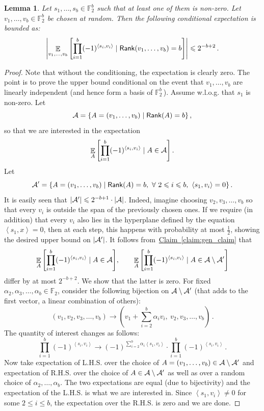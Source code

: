 \documentclass[11pt]{article}
\numberwithin{equation}{section}
\newtheorem{lemma}[theorem]{Lemma}
\theoremstyle{definition}
\theoremstyle{plain}
\newcommand{\expref}[2]{\hyperref[#2]{#1~\ref{#2}}}
\newcommand\Expect[2]{{\mathop{\mathbb{E}}_{#1}\left[ {#2} \right]}}
\renewcommand\leq{\leqslant}
\begin{document}
\begin{lemma}\label{lemma:basis_exp}
Let $s_1, \ldots, s_b \in {\mathbb F}_2^b$ such that at least one of them is non-zero. Let $v_1, \ldots, v_b \in {\mathbb F}_2^b$ be chosen
at random. Then the following conditional expectation is bounded as:
$$ \left| \Expect{v_1,\ldots,v_b}{\prod_{i=1}^b (-1)^{\left<s_i, v_i \right> }
\mid {\sf Rank}(v_1,\ldots,v_b)=b }\right|  \leq
  2^{-b+2}\,.$$%
\end{lemma}
\begin{proof} Note that without the conditioning, the expectation is clearly zero. The point is to prove the upper bound conditional on the event that
$v_1, \ldots, v_b$ are linearly independent
(and hence form a basis of ${\mathbb F}_2^b\,$). %
Assume w.l.o.g. that $s_1$ is non-zero. Let
 $$ {\cal A}  = \{ A =  (v_1, \ldots, v_b) \mid {\sf Rank} (A) = b \}\,,$$%
so that we are interested in the expectation
 $$   \Expect{A}{\prod_{i=1}^b (-1)^{\left<s_i, v_i \right> } \mid A \in {\cal A} }\,.  $$%
 Let
 $$ {\cal A'}  = \{ A =  (v_1, \ldots, v_b) \mid {\sf Rank} (A) = b, ~\forall ~2 \leq i \leq b, ~\left<  s_1, v_i \right> = 0 \}\,.$$%
It is easily seen that $|{\cal A}'| \leq 2^{-b+1} \cdot |{\cal A}|$.
Indeed, %
imagine choosing $v_2, v_3, \ldots, v_b$ so that every $v_i$ is outside
the span of the previously chosen ones. If we require (in addition) that every $v_i$ also lies in
the hyperplane defined by the equation
$\left< s_1, x \right> = 0$, then at each step,
this happens with probability at most $\frac{1}{2}$, showing the desired upper bound on
$|{\cal A}'|$.
It follows from~\expref{Claim}{claim:gen_claim} that
%
$$ \Expect{A}{\prod_{i=1}^b (-1)^{\left<s_i, v_i \right> } \mid A \in {\cal A} }, \quad  \quad
\Expect{A}{\prod_{i=1}^b (-1)^{\left<s_i, v_i \right> } \mid A \in {\cal A}\setminus {\cal A}' } $$
differ by at most $2^{-b+2}$.  %
%
We show that the latter is zero. For fixed $\alpha_2, \alpha_3,\ldots, \alpha_b \in {\mathbb F}_2$,
consider the following bijection on $ {\cal A}\setminus {\cal A}' $ (that adds to the first vector, a linear combination of others):
  $$  (v_1, v_2, v_3, \ldots, v_b)  \to   (v_1 + \sum_{i=2}^b \alpha_i v_i, ~v_2, v_3, \ldots, v_b)\,. $$%
 The quantity of interest changes as follows:
  $$ \prod_{i=1}^b (-1)^{\left<s_i, v_i \right> }   \to   (-1)^{ \sum_{i=2}^b \alpha_i \left< s_1, v_i\right>} \cdot   \prod_{i=1}^b (-1)^{\left<s_i, v_i \right> }\,. $$%
Now take expectation of L.H.S. over the choice of $A = (v_1,\ldots,v_b)  \in {\cal A}\setminus {\cal A}'$ and expectation of R.H.S. over
the choice of $A  \in {\cal A}\setminus {\cal A}'$
as well as over a random choice of  $\alpha_2, \ldots, \alpha_b$. The two expectations are equal (due to bijectivity)
and the expectation of the L.H.S. is what we are interested in.
Since $ \left< s_1, v_i\right> \neq 0$ for some $2 \leq i \leq b$, the expectation over the R.H.S. is zero and we are done.
\end{proof}
\end{document}
